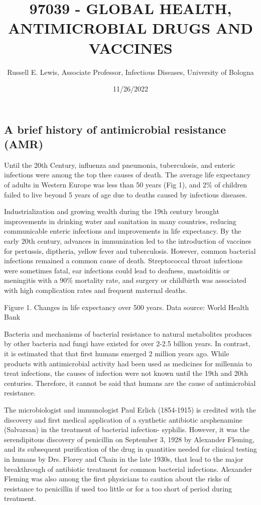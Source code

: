\documentclass[]{tufte-handout}
\title{97039 - GLOBAL HEALTH, ANTIMICROBIAL DRUGS AND VACCINES}
\author{Russell E. Lewis, Associate Professor, Infectious Diseases,
University of Bologna}
\date{11/26/2022}
\begin{document}
\maketitle




\hypertarget{a-brief-history-of-antimicrobial-resistance-amr}{%
\subsection*{A brief history of antimicrobial resistance
(AMR)}\label{a-brief-history-of-antimicrobial-resistance-amr}}

Until the 20th Century, influenza and pneumonia, tuberculosis, and
enteric infections were among the top thee causes of death. The average
life expectancy of adults in Western Europe was less than 50 years (Fig
1), and 2\% of children failed to live beyond 5 years of age due to
deaths caused by infectious diseases.

Industrialization and growing wealth during the 19th century brought
improvements in drinking water and sanitation in many countries,
reducing communicable enteric infections and improvements in life
expectancy. By the early 20th century, advances in immunization led to
the introduction of vaccines for pertussis, diptheria, yellow fever and
tuberculosis. However, common bacterial infections remained a common
cause of death. Streptococcal throat infections were sometimes fatal,
ear infections could lead to deafness, mastoiditis or meningitis with a
90\% mortality rate, and surgery or childbirth was associated with high
complication rates and frequent maternal deaths.

Figure 1. Changes in life expectancy over 500 years. Data source: World
Health Bank

Bacteria and mechanisms of bacterial resistance to natural metabolites
produces by other bacteria nad fungi have existed for over 2-2.5 billion
years. In contrast, it is estimated that that first humans emerged 2
million years ago. While products with antimicrobial activity had been
used as medicines for millennia to treat infections, the causes of
infection were not known until the 19th and 20th centuries. Therefore,
it cannot be said that humans are the cause of antimicrobial resistance.

The microbiologist and immunologist Paul Erlich (1854-1915) is credited
with the discovery and first medical application of a synthetic
antibiotic arsphenamine (Salvarsan) in the treatment of bacterial
infection- syphilis. However, it was the serendipitous discovery of
penicillin on September 3, 1928 by Alexander Fleming, and its subsequent
purification of the drug in quantities needed for clinical testing in
humans by Drs. Florey and Chain in the late 1930s, that lead to the
major breakthrough of antibiotic treatment for common bacterial
infections. Alexander Fleming was also among the first physicians to
caution about the risks of resistance to penicillin if used too little
or for a too short of period during treatment.
\end{document}
